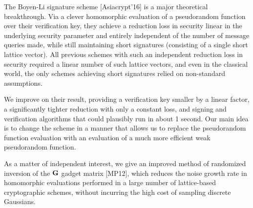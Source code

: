 The Boyen-Li signature scheme [Asiacrypt'16] is a major theoretical breakthrough. Via a clever homomorphic evaluation of a pseudorandom function over their verification key, they achieve a reduction loss in security linear in the underlying security parameter and entirely independent of the number of message queries made, while still maintaining short signatures (consisting of a single short lattice vector). All previous schemes with such an independent reduction loss in security required a linear number of such lattice vectors, and even in the classical world, the only schemes achieving short signatures relied on non-standard assumptions. 

We improve on their result, providing a verification key smaller by a linear factor, a significantly tighter reduction with only a constant loss, and signing and verification algorithms that could plausibly run in about 1 second. Our main idea is to change the scheme in a manner that allows us to replace the pseudorandom function evaluation with an evaluation of a much more efficient weak pseudorandom function.

As a matter of independent interest, we give an improved method of randomized inversion of the $\mathbf{G}$ gadget matrix [MP12], which reduces the noise growth rate in homomorphic evaluations performed in a large number of lattice-based cryptographic schemes,  without incurring the high cost of sampling discrete Gaussians. 